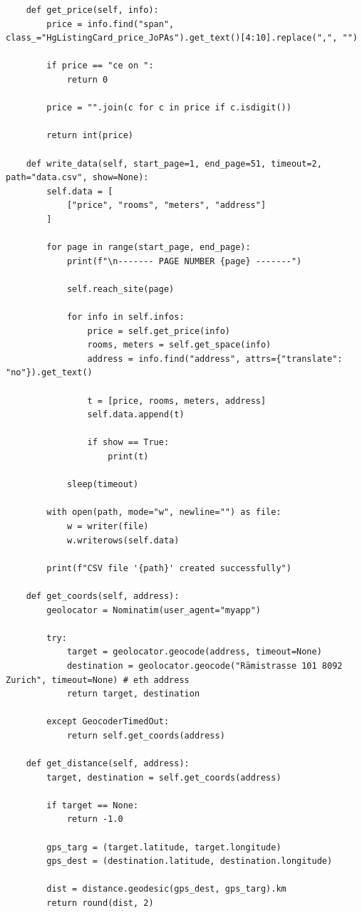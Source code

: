 \documentclass[12pt]{article}
\begin{document}
\begin{lstlisting}
    def get_price(self, info):
        price = info.find("span", class_="HgListingCard_price_JoPAs").get_text()[4:10].replace(",", "")

        if price == "ce on ":
            return 0

        price = "".join(c for c in price if c.isdigit())

        return int(price)

    def write_data(self, start_page=1, end_page=51, timeout=2, path="data.csv", show=None):
        self.data = [
            ["price", "rooms", "meters", "address"]
        ]

        for page in range(start_page, end_page):
            print(f"\n------- PAGE NUMBER {page} -------")

            self.reach_site(page)

            for info in self.infos:
                price = self.get_price(info)
                rooms, meters = self.get_space(info)
                address = info.find("address", attrs={"translate": "no"}).get_text()
                
                t = [price, rooms, meters, address]
                self.data.append(t)

                if show == True:
                    print(t)

            sleep(timeout)

        with open(path, mode="w", newline="") as file:
            w = writer(file)
            w.writerows(self.data)

        print(f"CSV file '{path}' created successfully")

    def get_coords(self, address):
        geolocator = Nominatim(user_agent="myapp")

        try:
            target = geolocator.geocode(address, timeout=None)
            destination = geolocator.geocode("Rämistrasse 101 8092 Zurich", timeout=None) # eth address
            return target, destination

        except GeocoderTimedOut:
            return self.get_coords(address)

    def get_distance(self, address):
        target, destination = self.get_coords(address)

        if target == None:
            return -1.0

        gps_targ = (target.latitude, target.longitude)
        gps_dest = (destination.latitude, destination.longitude)

        dist = distance.geodesic(gps_dest, gps_targ).km
        return round(dist, 2)


\end{lstlisting}
\end{document}
